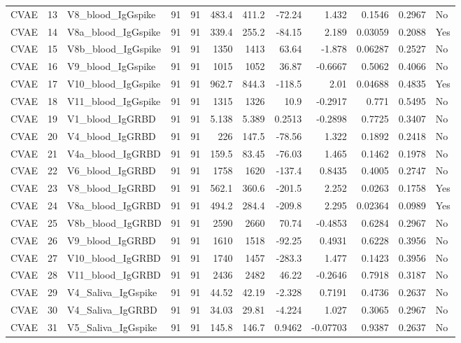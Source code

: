\begin{longtable}{lrp{}rrrrrrrrl}
CVAE & 13 & V8\_blood\_IgGspike & 91 & 91 & 483.4 & 411.2 & -72.24 & 1.432 & 0.1546 & 0.2967 & No \\
CVAE & 14 & V8a\_blood\_IgGspike & 91 & 91 & 339.4 & 255.2 & -84.15 & 2.189 & 0.03059 & 0.2088 & Yes \\
CVAE & 15 & V8b\_blood\_IgGspike & 91 & 91 & 1350 & 1413 & 63.64 & -1.878 & 0.06287 & 0.2527 & No \\
CVAE & 16 & V9\_blood\_IgGspike & 91 & 91 & 1015 & 1052 & 36.87 & -0.6667 & 0.5062 & 0.4066 & No \\
CVAE & 17 & V10\_blood\_IgGspike & 91 & 91 & 962.7 & 844.3 & -118.5 & 2.01 & 0.04688 & 0.4835 & Yes \\
CVAE & 18 & V11\_blood\_IgGspike & 91 & 91 & 1315 & 1326 & 10.9 & -0.2917 & 0.771 & 0.5495 & No \\
CVAE & 19 & V1\_blood\_IgGRBD & 91 & 91 & 5.138 & 5.389 & 0.2513 & -0.2898 & 0.7725 & 0.3407 & No \\
CVAE & 20 & V4\_blood\_IgGRBD & 91 & 91 & 226 & 147.5 & -78.56 & 1.322 & 0.1892 & 0.2418 & No \\
CVAE & 21 & V4a\_blood\_IgGRBD & 91 & 91 & 159.5 & 83.45 & -76.03 & 1.465 & 0.1462 & 0.1978 & No \\
CVAE & 22 & V6\_blood\_IgGRBD & 91 & 91 & 1758 & 1620 & -137.4 & 0.8435 & 0.4005 & 0.2747 & No \\
CVAE & 23 & V8\_blood\_IgGRBD & 91 & 91 & 562.1 & 360.6 & -201.5 & 2.252 & 0.0263 & 0.1758 & Yes \\
CVAE & 24 & V8a\_blood\_IgGRBD & 91 & 91 & 494.2 & 284.4 & -209.8 & 2.295 & 0.02364 & 0.0989 & Yes \\
CVAE & 25 & V8b\_blood\_IgGRBD & 91 & 91 & 2590 & 2660 & 70.74 & -0.4853 & 0.6284 & 0.2967 & No \\
CVAE & 26 & V9\_blood\_IgGRBD & 91 & 91 & 1610 & 1518 & -92.25 & 0.4931 & 0.6228 & 0.3956 & No \\
CVAE & 27 & V10\_blood\_IgGRBD & 91 & 91 & 1740 & 1457 & -283.3 & 1.477 & 0.1423 & 0.3956 & No \\
CVAE & 28 & V11\_blood\_IgGRBD & 91 & 91 & 2436 & 2482 & 46.22 & -0.2646 & 0.7918 & 0.3187 & No \\
CVAE & 29 & V4\_Saliva\_IgGspike & 91 & 91 & 44.52 & 42.19 & -2.328 & 0.7191 & 0.4736 & 0.2637 & No \\
CVAE & 30 & V4\_Saliva\_IgGRBD & 91 & 91 & 34.03 & 29.81 & -4.224 & 1.027 & 0.3065 & 0.2967 & No \\
CVAE & 31 & V5\_Saliva\_IgGspike & 91 & 91 & 145.8 & 146.7 & 0.9462 & -0.07703 & 0.9387 & 0.2637 & No \\

\end{longtable}
